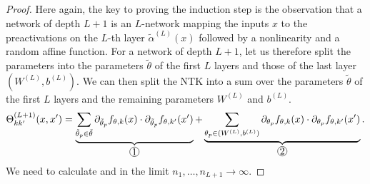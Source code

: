 \documentclass[10pt]{article}
\newcommand*\circled[1]{\tikz[baseline=(char.base)]{\node[shape=circle,draw,inner sep=0.5pt] (char) {#1};}}
\newcommand{\paran}[1]{{( #1 )}}
\begin{document}
\begin{proof}
Here again, the key to proving the induction step is the observation that a network of depth $L + 1$ is an $L$-network mapping the inputs $x$ to the preactivations on the $L$-th layer $\tilde{\alpha}^\paran{L}(x)$ followed by a nonlinearity and a random affine function. For a network of depth $L + 1$, let us therefore split the parameters into the parameters $\tilde{\theta}$ of the first $L$ layers and those of the last layer $(W^\paran{L},b^\paran{L})$. We can then split the NTK into a sum over the parameters $\tilde{\theta}$ of the first $L$ layers and the remaining parameters $W^\paran{L}$ and $b^\paran{L}$.
\begin{align*}
\Theta^\paran{L + 1}_{kk'}(x,x') = \underbrace{\sum_{\tilde{\theta}_p \in \tilde{\theta}} \partial_{\tilde{\theta}_p} f_{\theta,k}(x) \cdot \partial_{\tilde{\theta}_p} f_{\theta,k'}(x')}_{\circled{1}} + \underbrace{\sum_{\theta_p \in (W^\paran{L},b^\paran{L})} \partial_{\theta_p} f_{\theta,k}(x) \cdot \partial_{\theta_p} f_{\theta,k'}(x')}_{\circled{2}}.
\end{align*}
We need to calculate \circled{1} and \circled{2} in the limit $n_1, \ldots, n_{L + 1} \rightarrow \infty$.


\end{proof}
\end{document}
